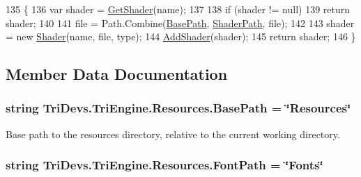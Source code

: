 \begin{DoxyCode}
135         \{
136             var shader = \hyperlink{class_tri_devs_1_1_tri_engine_1_1_resources_a058557a8b90fde6e4d5a99446b940ca1}{GetShader}(name);
137 
138             \textcolor{keywordflow}{if} (shader != null)
139                 \textcolor{keywordflow}{return} shader;
140 
141             file = Path.Combine(\hyperlink{class_tri_devs_1_1_tri_engine_1_1_resources_af47b8cda82cb2fc89cedbd8546997e77}{BasePath}, \hyperlink{class_tri_devs_1_1_tri_engine_1_1_resources_a12c789a4eefef5dd60c990aa1efd2915}{ShaderPath}, file);
142 
143             shader = \textcolor{keyword}{new} \hyperlink{class_tri_devs_1_1_tri_engine_1_1_shaders_1_1_shader}{Shader}(name, file, type);
144             \hyperlink{class_tri_devs_1_1_tri_engine_1_1_resources_a81083cc6b02468d7a437f34bddf455d0}{AddShader}(shader);
145             \textcolor{keywordflow}{return} shader;
146         \}
\end{DoxyCode}


\subsection{Member Data Documentation}
\hypertarget{class_tri_devs_1_1_tri_engine_1_1_resources_af47b8cda82cb2fc89cedbd8546997e77}{
\subsubsection[{Base\-Path}]{\setlength{\rightskip}{0pt plus 5cm}string Tri\-Devs.\-Tri\-Engine.\-Resources.\-Base\-Path = \char`\"{}Resources\char`\"{}\hspace{0.3cm}{\ttfamily [static]}}}\label{class_tri_devs_1_1_tri_engine_1_1_resources_af47b8cda82cb2fc89cedbd8546997e77}


Base path to the resources directory, relative to the current working directory. 

\hypertarget{class_tri_devs_1_1_tri_engine_1_1_resources_aea17ebe400f5b84c30cb0a7e0f965f42}{
\subsubsection[{Font\-Path}]{\setlength{\rightskip}{0pt plus 5cm}string Tri\-Devs.\-Tri\-Engine.\-Resources.\-Font\-Path = \char`\"{}Fonts\char`\"{}\hspace{0.3cm}{\ttfamily [static]}}}\label{class_tri_devs_1_1_tri_engine_1_1_resources_aea17ebe400f5b84c30cb0a7e0f965f42}


